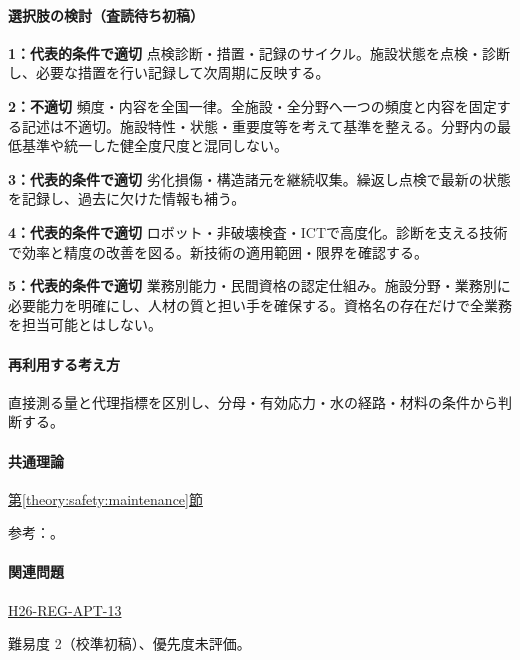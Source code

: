 \paragraph{選択肢の検討（査読待ち初稿）}\mbox{}\par

\noindent\textbf{1：代表的条件で適切} 点検診断・措置・記録のサイクル。施設状態を点検・診断し、必要な措置を行い記録して次周期に反映する。\par

\noindent\textbf{2：不適切} 頻度・内容を全国一律。全施設・全分野へ一つの頻度と内容を固定する記述は不適切。施設特性・状態・重要度等を考えて基準を整える。分野内の最低基準や統一した健全度尺度と混同しない。\par

\noindent\textbf{3：代表的条件で適切} 劣化損傷・構造諸元を継続収集。繰返し点検で最新の状態を記録し、過去に欠けた情報も補う。\par

\noindent\textbf{4：代表的条件で適切} ロボット・非破壊検査・ICTで高度化。診断を支える技術で効率と精度の改善を図る。新技術の適用範囲・限界を確認する。\par

\noindent\textbf{5：代表的条件で適切} 業務別能力・民間資格の認定仕組み。施設分野・業務別に必要能力を明確にし、人材の質と担い手を確保する。資格名の存在だけで全業務を担当可能とはしない。\par

\paragraph{再利用する考え方} 直接測る量と代理指標を区別し、分母・有効応力・水の経路・材料の条件から判断する。

\paragraph{共通理論} \hyperref[theory:safety:maintenance]{第\ref*{theory:safety:maintenance}節}

\par 参考：\cite{eng52_infra2014}。

\paragraph{関連問題} \hyperref[q:h26-reg-apt-13]{H26-REG-APT-13}

\par 難易度 2（校準初稿）、優先度未評価。

